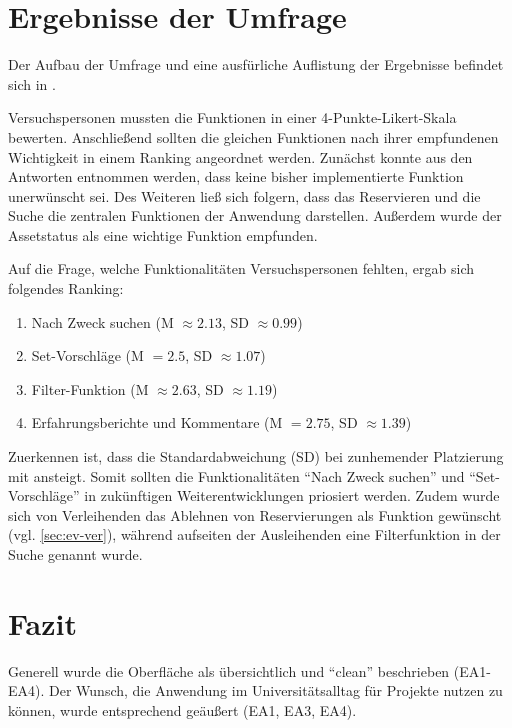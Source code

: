 \section{Ergebnisse der Umfrage}
Der Aufbau der Umfrage und eine ausfürliche Auflistung der Ergebnisse befindet sich in . 

Versuchspersonen mussten die Funktionen in einer 4-Punkte-Likert-Skala bewerten. Anschließend
sollten die gleichen Funktionen nach ihrer empfundenen Wichtigkeit in einem Ranking angeordnet
werden. Zunächst konnte aus den Antworten entnommen werden, dass keine bisher implementierte
Funktion unerwünscht sei. Des Weiteren ließ sich folgern, dass das Reservieren und die Suche die
zentralen Funktionen der Anwendung darstellen. Außerdem wurde der Assetstatus als eine wichtige
Funktion empfunden.  

Auf die Frage, welche Funktionalitäten Versuchspersonen fehlten, ergab sich folgendes Ranking:
\begin{enumerate}
  \item Nach Zweck suchen (M \(\approx 2.13\), SD \(\approx 0.99\))
  \item Set-Vorschläge (M \( = 2.5\), SD \(\approx 1.07\))
  \item Filter-Funktion (M \( \approx 2.63\), SD \(\approx 1.19\))
  \item Erfahrungsberichte und Kommentare (M \( = 2.75\), SD \(\approx 1.39\))
\end{enumerate}

Zuerkennen ist, dass die Standardabweichung (SD) bei zunhemender Platzierung mit ansteigt. Somit
sollten die Funktionalitäten \enquote{Nach Zweck suchen} und \enquote{Set-Vorschläge}  in
zukünftigen Weiterentwicklungen priosiert werden.  Zudem wurde sich von Verleihenden das Ablehnen von
Reservierungen als Funktion gewünscht (vgl. \ref{sec:ev-ver}), während aufseiten der Ausleihenden
eine Filterfunktion in der Suche genannt wurde.


\section{Fazit}
Generell wurde die Oberfläche als übersichtlich und \enquote{clean} beschrieben
(EA1-EA4). Der Wunsch, die Anwendung im Universitätsalltag für Projekte
nutzen zu können, wurde entsprechend geäußert (EA1, EA3, EA4).

